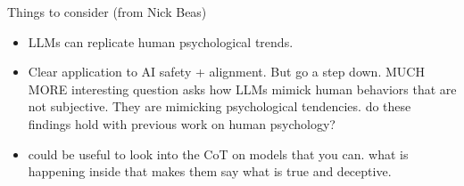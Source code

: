\documentclass{article}
\begin{document}
Things to consider (from Nick Beas)
\begin{itemize}
    \item LLMs can replicate human psychological trends.
    \item Clear application to AI safety + alignment. But go a step down. MUCH MORE interesting question asks how LLMs mimick human behaviors that are not subjective. They are mimicking psychological tendencies. do these findings hold with previous work on human psychology?
    \item could be useful to look into the CoT on models that you can. what is happening inside that makes them say what is true and deceptive.
\end{itemize}



\end{document}
